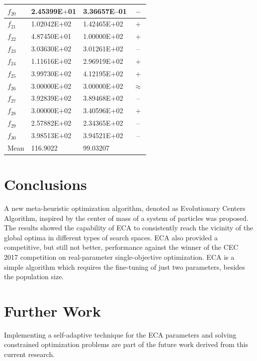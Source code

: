 \documentclass{svproc}
\begin{document}
\begin{table}
{\begin{tabular}{p{1cm}p{2.5cm}p{2.5cm}c}
		$f_{20}$ & 2.45399E$+$01  & 3.36657E--01 & --  \\ \hline
		$f_{21}$ & 1.02042E$+$02  & 1.42465E$+$02 & +  \\ \hline
		$f_{22}$ & 4.87450E$+$01  & 1.00000E$+$02 & +  \\ \hline
		$f_{23}$ & 3.03630E$+$02  & 3.01261E$+$02 & --  \\ \hline
		$f_{24}$ & 1.11616E$+$02  & 2.96919E$+$02 & +  \\ \hline
		$f_{25}$ & 3.99730E$+$02  & 4.12195E$+$02 & +  \\ \hline
		$f_{26}$ & 3.00000E$+$02  & 3.00000E$+$02 & $\approx$  \\ \hline
		$f_{27}$ & 3.92839E$+$02  & 3.89468E$+$02 & --  \\ \hline
		$f_{28}$ & 3.00000E$+$02  & 3.40596E$+$02 & +  \\ \hline
		$f_{29}$ & 2.57882E$+$02  & 2.34365E$+$02 & --  \\ \hline
		$f_{30}$ & 3.98513E$+$02  & 3.94521E$+$02 & --  \\ \hline
			Mean & 116.9022       & 99.03207 & \\ \hline
	\end{tabular}
}
\end{table}



\section{Conclusions} %
\label{sec:conclusions}

A new meta-heuristic optimization algorithm, denoted as Evolutionary Centers 
Algorithm, inspired by the center of mass of a system of particles was proposed. 
The results showed the capability of ECA to consistently reach the vicinity 
of the global optima in different types of search spaces. ECA also provided 
a competitive, but still not better, performance against the winner of the 
CEC 2017 competition on real-parameter single-objective optimization. ECA 
is a simple algorithm which requires the fine-tuning of just two parameters, 
besides the population size.\\



\section{Further Work} %
\label{sec:further_work}

Implementing a self-adaptive technique for the ECA parameters and solving 
constrained optimization problems are part of the future work derived 
from this current research. 


\clearpage


\end{document}
